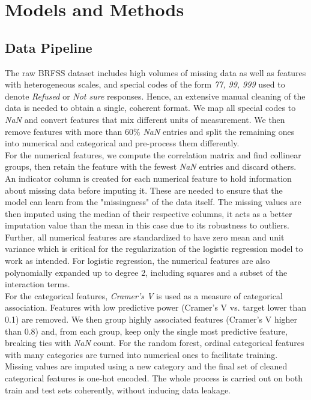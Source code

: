 \documentclass[10pt,conference,compsocconf]{IEEEtran}
\begin{document}
\section{Models and Methods}
\label{sec:models-and-methods}

\subsection{Data Pipeline}
The raw BRFSS dataset includes high volumes of missing data as well as features with heterogeneous scales, and special codes of the form \textit{77, 99, 999} used to denote \textit{Refused} or \textit{Not sure} responses. Hence, an extensive manual cleaning of the data is needed to obtain a single, coherent format. We map all special codes to \textit{NaN} and convert features that mix different units of measurement. We then remove features with more than $60\%$ \textit{NaN} entries and split the remaining ones into numerical and categorical and pre-process them differently.\\
For the numerical features, we compute the correlation matrix and find collinear groups, then retain the feature with the fewest \textit{NaN} entries and discard others. An indicator column is created for each numerical feature to hold information about missing data before imputing it. These are needed to ensure that the model can learn from the "missingness" of the data itself. The missing values are then imputed using the median of their respective columns, it acts as a better imputation value than the mean in this case due to its robustness to outliers. Further, all numerical features are standardized to have zero mean and unit variance which is critical for the regularization of the logistic regression model to work as intended. For logistic regression, the numerical features are also polynomially expanded up to degree 2, including squares and a subset of the interaction terms.\\
For the categorical features, \textit{Cramer's V} is used as a measure of categorical association. Features with low predictive power (Cramer's V vs. target lower than 0.1) are removed. We then group highly associated features (Cramer's V higher than 0.8) and, from each group, keep only the single most predictive feature, breaking ties with \textit{NaN} count. For the random forest, ordinal categorical features with many categories are turned into numerical ones to facilitate training. Missing values are imputed using a new category and the final set of cleaned categorical features is one-hot encoded. The whole process is carried out on both train and test sets coherently, without inducing data leakage.
\end{document}
